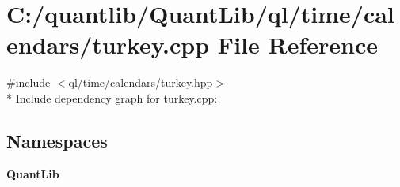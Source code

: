 \section{C\+:/quantlib/\+Quant\+Lib/ql/time/calendars/turkey.cpp File Reference}
\label{turkey_8cpp}
{\ttfamily \#include $<$ql/time/calendars/turkey.\+hpp$>$}\\*
Include dependency graph for turkey.\+cpp\+:
\subsection*{Namespaces}
\begin{DoxyCompactItemize}
\item 
 {\bf Quant\+Lib}
\end{DoxyCompactItemize}
